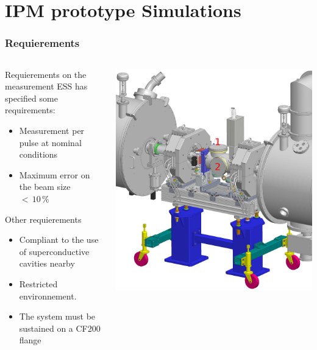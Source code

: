 \section{IPM prototype Simulations}

\begin{frame}
  \frametitle{Requierements}
  \begin{columns}
    \begin{column}{0.45\textwidth}
      \begin{block}{Requierements on the measurement}
        ESS has specified some requirements:
        \begin{itemize}
          \item Measurement per pulse at nominal conditions
          \item Maximum error on the beam size $<\,10\,\%$
        \end{itemize}
      \end{block}
      \begin{block}{Other requierements}
        \begin{itemize}
          \item Compliant to the use of superconductive cavities nearby
          \item Restricted environnement.
          \item The system must be sustained on a CF200 flange
        \end{itemize}
      \end{block}
    \end{column}
    \begin{column}{0.45\textwidth}
      \includegraphics[width=\textwidth]{03_SIM/fig/fig016_LWU_Cryo4}
    \end{column}
  \end{columns}
\end{frame}

